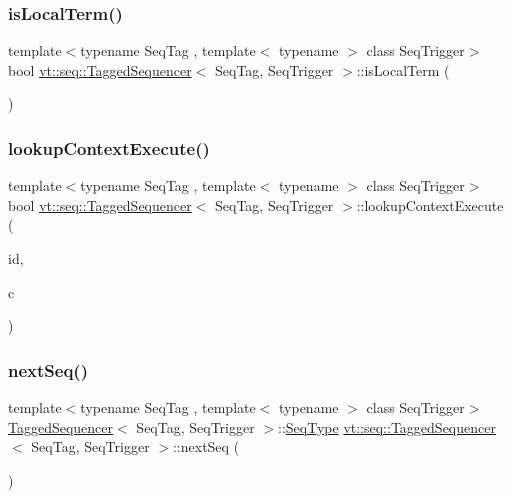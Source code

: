 \subsubsection{\texorpdfstring{is\+Local\+Term()}{isLocalTerm()}}
{\footnotesize\ttfamily template$<$typename Seq\+Tag , template$<$ typename $>$ class Seq\+Trigger$>$ \\
bool \hyperlink{structvt_1_1seq_1_1_tagged_sequencer}{vt\+::seq\+::\+Tagged\+Sequencer}$<$ Seq\+Tag, Seq\+Trigger $>$\+::is\+Local\+Term (\begin{DoxyParamCaption}{ }\end{DoxyParamCaption})}

\mbox{\label{structvt_1_1seq_1_1_tagged_sequencer_aacd0771ce78276cd9385f5ca742fe099}} 
\subsubsection{\texorpdfstring{lookup\+Context\+Execute()}{lookupContextExecute()}}
{\footnotesize\ttfamily template$<$typename Seq\+Tag , template$<$ typename $>$ class Seq\+Trigger$>$ \\
bool \hyperlink{structvt_1_1seq_1_1_tagged_sequencer}{vt\+::seq\+::\+Tagged\+Sequencer}$<$ Seq\+Tag, Seq\+Trigger $>$\+::lookup\+Context\+Execute (\begin{DoxyParamCaption}\item[{\hyperlink{structvt_1_1seq_1_1_tagged_sequencer_a1c8ee839258d0f88c49ef660267a81d5}{Seq\+Type} const \&}]{id,  }\item[{\hyperlink{structvt_1_1seq_1_1_tagged_sequencer_ad8a1ed9b8c012cf2a73ebd2e46d6d899}{Seq\+Ctx\+Function\+Type}}]{c }\end{DoxyParamCaption})}

\mbox{\label{structvt_1_1seq_1_1_tagged_sequencer_af7a02a262d3da7958b24b7d7997df9f1}} 
\subsubsection{\texorpdfstring{next\+Seq()}{nextSeq()}}
{\footnotesize\ttfamily template$<$typename Seq\+Tag , template$<$ typename $>$ class Seq\+Trigger$>$ \\
\hyperlink{structvt_1_1seq_1_1_tagged_sequencer}{Tagged\+Sequencer}$<$ Seq\+Tag, Seq\+Trigger $>$\+::\hyperlink{structvt_1_1seq_1_1_tagged_sequencer_a1c8ee839258d0f88c49ef660267a81d5}{Seq\+Type} \hyperlink{structvt_1_1seq_1_1_tagged_sequencer}{vt\+::seq\+::\+Tagged\+Sequencer}$<$ Seq\+Tag, Seq\+Trigger $>$\+::next\+Seq (\begin{DoxyParamCaption}{ }\end{DoxyParamCaption})}

